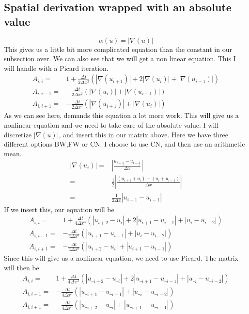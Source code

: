 \documentclass[norsk,11pt,a4paper]{article}
\begin{document}
\subsection*{Spatial derivation wrapped with an absolute value}
\begin{equation}
	\alpha(u) = |\nabla(u)|
\end{equation}
This gives us a little bit more complicated equation than the constant in our
subsection over. We can also see that we will get a non linear equation. This I
will handle with a Picard iteration.
\begin{align*} \label{eq:matrix_absolute}
A_{i,i} =& 1+\frac{\Delta t}{2\Delta x^2}(|\nabla(u_{i+1})|+2|\nabla(u_i)|+|\nabla(u_{i-1})|)\\
A_{i,i-1} =&-\frac{\Delta t}{2\Delta x^2}(|\nabla(u_i)|+|\nabla(u_{i-1})|)\\
A_{i,i+1} =&-\frac{\Delta t}{2\Delta x^2}(|\nabla(u_{i+1})|+|\nabla(u_i)|)
\end{align*}                               
As we can see here, demands this equation a lot more work. This will give us a nonlinear equation and
we need to take care of the absolute value. I will discretize $|\nabla(u)|$, and insert this in our matrix above.
Here we have three different options BW,FW or CN. I choose to use CN, and then use an arithmetic mean.
\begin{align*}
|\nabla(u_i)|=&\left|\frac{u_{i+\frac{1}{2}}-u_{i-\frac{1}{2}}}{\Delta x}\right|\\
=&\frac{1}{2}\left|\frac{(u_{i+1}+u_i)-(u_i+u_{i-1})}{\Delta x}\right|\\
=&\frac{1}{2\Delta x}\left|u_{i+1}-u_{i-1}\right|
\end{align*}
If we insert this, our equation will be
\begin{align*} 
A_{i,i} =& 1+\frac{\Delta t}{4\Delta x^3}(|u_{i+2}-u_i|+2|u_{i+1}-u_{i-1}|+|u_{i}-u_{i-2}|)\\
A_{i,i-1} =&-\frac{\Delta t}{4\Delta x^3}(|u_{i+1}-u_{i-1}|+|u_{i}-u_{i-2}|)\\
A_{i,i+1} =&-\frac{\Delta t}{4\Delta x^3}(|u_{i+2}-u_i|+|u_{i+1}-u_{i-1}|)
\end{align*}                               
Since this will give us a nonlinear equation, we need to use Picard. The matrix will 
then be
\begin{align*} 
A_{i,i} =& 1+\frac{\Delta t}{4\Delta x^3}(|u\__{i+2}-u\__i|+2|u\__{i+1}-u\__{i-1}|+|u\__{i}-u\__{i-2}|)\\
A_{i,i-1} =&-\frac{\Delta t}{4\Delta x^3}(|u\__{i+1}-u\__{i-1}|+|u\__{i}-u\__{i-2}|)\\
A_{i,i+1} =&-\frac{\Delta t}{4\Delta x^3}(|u\__{i+2}-u\__i|+|u\__{i+1}-u\__{i-1}|)
\end{align*}                               
\end{document}
